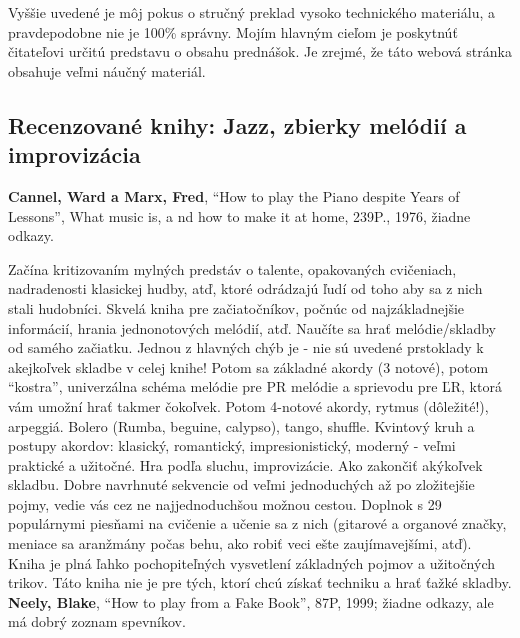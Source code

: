 Vyššie uvedené je môj pokus o stručný preklad vysoko technického materiálu, a pravdepodobne nie je 100\% správny. Mojím hlavným cieľom je poskytnúť čitateľovi určitú predstavu o obsahu prednášok. Je zrejmé, že táto webová stránka obsahuje veľmi náučný materiál. 

\subsection*{Recenzované knihy: Jazz, zbierky melódií a improvizácia}
\textbf{Cannel, Ward a Marx, Fred}, “How to play the Piano despite Years of Lessons”, What music is, a nd how to make it at home, 239P., 1976, žiadne odkazy. 

Začína kritizovaním mylných predstáv o talente, opakovaných cvičeniach, nadradenosti klasickej hudby, atď, ktoré odrádzajú ľudí od toho aby sa z nich stali hudobníci. Skvelá kniha pre začiatočníkov, počnúc od najzákladnejšie informácií, hrania jednonotových melódií, atď. Naučíte sa hrať melódie/skladby od samého začiatku. Jednou z hlavných chýb je - nie sú uvedené prstoklady k akejkoľvek skladbe v celej knihe! Potom sa základné akordy (3 notové), potom “kostra”, univerzálna schéma melódie pre PR melódie a sprievodu pre ĽR, ktorá vám umožní hrať takmer čokoľvek. Potom 4-notové akordy, rytmus (dôležité!), arpeggiá. Bolero (Rumba, beguine, calypso), tango, shuffle. Kvintový kruh a postupy akordov: klasický, romantický, impresionistický, moderný - veľmi praktické a užitočné. Hra podľa sluchu, improvizácie. Ako zakončiť akýkoľvek skladbu. Dobre navrhnuté sekvencie od veľmi jednoduchých až po zložitejšie pojmy, vedie vás cez ne najjednoduchšou možnou cestou. Doplnok s 29 populárnymi piesňami na cvičenie a učenie sa z nich (gitarové a organové značky, meniace sa aranžmány počas behu, ako robiť veci ešte zaujímavejšími, atď). Kniha je plná ľahko pochopiteľných vysvetlení základných pojmov a užitočných trikov. Táto kniha nie je pre tých, ktorí chcú získať techniku a hrať ťažké skladby.
\medskip\\
\textbf{Neely, Blake}, “How to play from a Fake Book”, 87P, 1999; žiadne odkazy, ale má dobrý zoznam spevníkov. 

